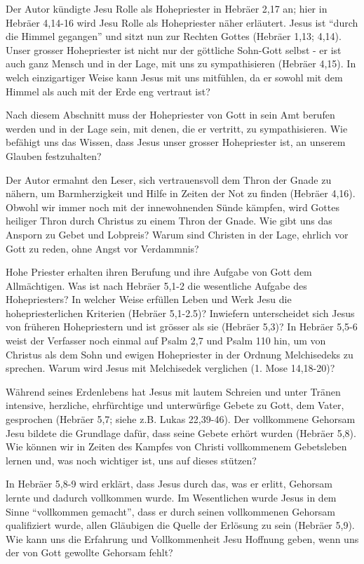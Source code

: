 \documentclass[]{krantz}
\begin{document}
Der Autor kündigte Jesu Rolle als Hohepriester in Hebräer 2,17 an; hier
in Hebräer 4,14-16 wird Jesu Rolle als Hohepriester näher erläutert.
Jesus ist ``durch die Himmel gegangen'' und sitzt nun zur Rechten Gottes
(Hebräer 1,13; 4,14). Unser grosser Hohepriester ist nicht nur der
göttliche Sohn-Gott selbst - er ist auch ganz Mensch und in der Lage,
mit uns zu sympathisieren (Hebräer 4,15). In welch einzigartiger Weise
kann Jesus mit uns mitfühlen, da er sowohl mit dem Himmel als auch mit
der Erde eng vertraut ist?

Nach diesem Abschnitt muss der Hohepriester von Gott in sein Amt berufen
werden und in der Lage sein, mit denen, die er vertritt, zu
sympathisieren. Wie befähigt uns das Wissen, dass Jesus unser grosser
Hohepriester ist, an unserem Glauben festzuhalten?

Der Autor ermahnt den Leser, sich vertrauensvoll dem Thron der Gnade zu
nähern, um Barmherzigkeit und Hilfe in Zeiten der Not zu finden (Hebräer
4,16). Obwohl wir immer noch mit der innewohnenden Sünde kämpfen, wird
Gottes heiliger Thron durch Christus zu einem Thron der Gnade. Wie gibt
uns das Ansporn zu Gebet und Lobpreis? Warum sind Christen in der Lage,
ehrlich vor Gott zu reden, ohne Angst vor Verdammnis?

Hohe Priester erhalten ihren Berufung und ihre Aufgabe von Gott dem
Allmächtigen. Was ist nach Hebräer 5,1-2 die wesentliche Aufgabe des
Hohepriesters? In welcher Weise erfüllen Leben und Werk Jesu die
hohepriesterlichen Kriterien (Hebräer 5,1-2.5)? Inwiefern unterscheidet
sich Jesus von früheren Hohepriestern und ist grösser als sie (Hebräer
5,3)? In Hebräer 5,5-6 weist der Verfasser noch einmal auf Psalm 2,7 und
Psalm 110 hin, um von Christus als dem Sohn und ewigen Hohepriester in
der Ordnung Melchisedeks zu sprechen. Warum wird Jesus mit Melchisedek
verglichen (1. Mose 14,18-20)?

Während seines Erdenlebens hat Jesus mit lautem Schreien und unter
Tränen intensive, herzliche, ehrfürchtige und unterwürfige Gebete zu
Gott, dem Vater, gesprochen (Hebräer 5,7; siehe z.B. Lukas 22,39-46).
Der vollkommene Gehorsam Jesu bildete die Grundlage dafür, dass seine
Gebete erhört wurden (Hebräer 5,8). Wie können wir in Zeiten des Kampfes
von Christi vollkommenem Gebetsleben lernen und, was noch wichtiger ist,
uns auf dieses stützen?

In Hebräer 5,8-9 wird erklärt, dass Jesus durch das, was er erlitt,
Gehorsam lernte und dadurch vollkommen wurde. Im Wesentlichen wurde
Jesus in dem Sinne ``vollkommen gemacht'', dass er durch seinen
vollkommenen Gehorsam qualifiziert wurde, allen Gläubigen die Quelle der
Erlösung zu sein (Hebräer 5,9). Wie kann uns die Erfahrung und
Vollkommenheit Jesu Hoffnung geben, wenn uns der von Gott gewollte
Gehorsam fehlt?
\end{document}
